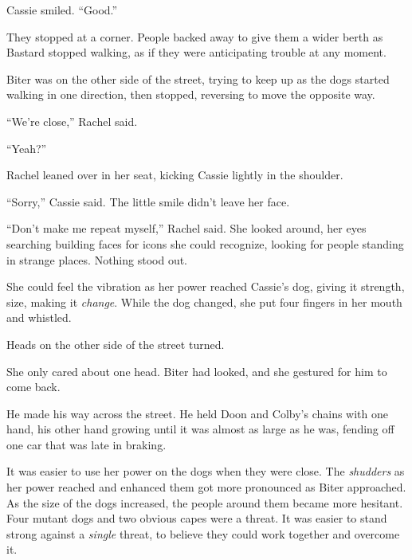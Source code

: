 Cassie smiled.  ``Good.''



They stopped at a corner.  People backed away to give them a wider berth as Bastard stopped walking, as if they were anticipating trouble at any moment.



Biter was on the other side of the street, trying to keep up as the dogs started walking in one direction, then stopped, reversing to move the opposite way.



``We're close,'' Rachel said.



``Yeah?''



Rachel leaned over in her seat, kicking Cassie lightly in the shoulder.



``Sorry,'' Cassie said.  The little smile didn't leave her face.



``Don't make me repeat myself,'' Rachel said.  She looked around, her eyes searching building faces for icons she could recognize, looking for people standing in strange places.  Nothing stood out.



She could feel the vibration as her power reached Cassie's dog, giving it strength, size, making it \emph{change}.  While the dog changed, she put four fingers in her mouth and whistled.



Heads on the other side of the street turned.



She only cared about one head.  Biter had looked, and she gestured for him to come back.



He made his way across the street.  He held Doon and Colby's chains with one hand, his other hand growing until it was almost as large as he was, fending off one car that was late in braking.



It was easier to use her power on the dogs when they were close.  The \emph{shudders }as her power reached and enhanced them got more pronounced as Biter approached.  As the size of the dogs increased, the people around them became more hesitant.  Four mutant dogs and two obvious capes were a threat.  It was easier to stand strong against a \emph{single} threat, to believe they could work together and overcome it.



